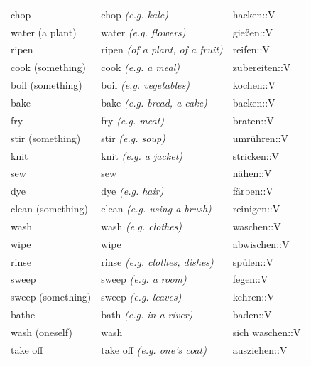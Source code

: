 \begin{center}
\begin{longtable}{lll}
{\sc \lowercase{	CHOP	}}	&	chop	\textit{\footnotesize (e.g. kale)}	&	hacken::V	\\
{\sc \lowercase{	WATER \footnotesize (A PLANT)	}}	&	water	\textit{\footnotesize (e.g. flowers)}	&	gießen::V	\\
{\sc \lowercase{	RIPEN	}}	&	ripen	\textit{\footnotesize (of a plant, of a fruit)}	&	reifen::V	\\
{\sc \lowercase{	COOK \footnotesize (SOMETHING)	}}	&	cook	\textit{\footnotesize (e.g. a meal)}	&	zubereiten::V	\\
{\sc \lowercase{	BOIL \footnotesize (SOMETHING)	}}	&	boil	\textit{\footnotesize (e.g. vegetables)}	&	kochen::V	\\
{\sc \lowercase{	BAKE	}}	&	bake	\textit{\footnotesize (e.g. bread, a cake)}	&	backen::V	\\
{\sc \lowercase{	FRY	}}	&	fry	\textit{\footnotesize (e.g. meat)}	&	braten::V	\\
{\sc \lowercase{	STIR \footnotesize (SOMETHING)	}}	&	stir	\textit{\footnotesize (e.g. soup)}	&	umrühren::V	\\
{\sc \lowercase{	KNIT	}}	&	knit	\textit{\footnotesize (e.g. a jacket)}	&	stricken::V	\\
{\sc \lowercase{	SEW	}}	&	sew		&	nähen::V	\\
{\sc \lowercase{	DYE	}}	&	dye	\textit{\footnotesize (e.g. hair)}	&	färben::V	\\
{\sc \lowercase{	CLEAN \footnotesize (SOMETHING)	}}	&	clean	\textit{\footnotesize (e.g. using a brush)}	&	reinigen::V	\\
{\sc \lowercase{	WASH	}}	&	wash	\textit{\footnotesize (e.g. clothes)}	&	waschen::V	\\
{\sc \lowercase{	WIPE	}}	&	wipe		&	abwischen::V	\\
{\sc \lowercase{	RINSE	}}	&	rinse	\textit{\footnotesize (e.g. clothes, dishes)}	&	spülen::V	\\
{\sc \lowercase{	SWEEP	}}	&	sweep	\textit{\footnotesize (e.g. a room)}	&	fegen::V	\\
{\sc \lowercase{	SWEEP \footnotesize (SOMETHING)	}}	&	sweep	\textit{\footnotesize (e.g. leaves)}	&	kehren::V	\\
{\sc \lowercase{	BATHE	}}	&	bath	\textit{\footnotesize (e.g. in a river)}	&	baden::V	\\
{\sc \lowercase{	WASH \footnotesize (ONESELF)	}}	&	wash		&	sich waschen::V	\\
{\sc \lowercase{	TAKE OFF	}}	&	take off	\textit{\footnotesize (e.g. one's coat)}	&	ausziehen::V	\\

\end{longtable}
\end{center}
